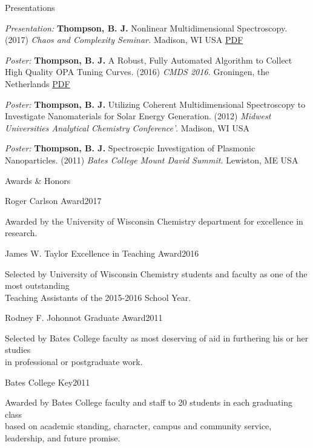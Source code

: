 \documentclass{resume}  %
\begin{document}
\clearpage

\begin{rSection}{Presentations}
  \begin{etaremune}[leftmargin = 1.75 em]
    \item \textit{Presentation:} \textbf{Thompson, B. J.}
      Nonlinear Multidimensional Spectroscopy.
      (2017)
      \textit{Chaos and Complexity Seminar.}
      Madison, WI USA
      \href{https://github.com/untzag/CV/raw/master/supplementary/2017-11-07\%20chaos.pdf}{PDF}
    \item \textit{Poster:}
      \textbf{Thompson, B. J.}
      A Robust, Fully Automated Algorithm to Collect High Quality OPA Tuning Curves.
      (2016)
      \textit{CMDS 2016.}
      Groningen, the Netherlands
      \href{https://github.com/untzag/CV/raw/master/supplementary/2016-06-01\%20CMDS.pdf}{PDF}
    \item \textit{Poster:}
      \textbf{Thompson, B. J.}
      Utilizing Coherent Multidimensional Spectroscopy to Investigate Nanomaterials for Solar
      Energy Generation.
      (2012)
      \textit{Midwest Universities Analytical Chemistry Conference'}.
      Madison, WI USA
    \item \textit{Poster:}
      \textbf{Thompson, B. J.}
      Spectroscpic Investigation of Plasmonic Nanoparticles.
      (2011)
      \textit{Bates College Mount David Summit.}
      Lewiston, ME USA
  \end{etaremune}
\end{rSection}

\begin{rSection}{Awards \& Honors}
  \begin{rSubsection}{Roger Carlson Award}{2017}{}{}
	  \item Awarded by the University of Wisconsin Chemistry department for excellence in research.
  \end{rSubsection}
  \begin{rSubsection}{James W. Taylor Excellence in Teaching Award}{2016}{}{}
    \item  Selected by University of Wisconsin Chemistry students and faculty as one of the most
      outstanding \\ Teaching Assistants of the 2015-2016 School Year.
  \end{rSubsection}
  \begin{rSubsection}{Rodney F. Johonnot Graduate Award}{2011}{}{}
    \item  Selected by Bates College faculty as most deserving of aid in furthering his or her
      studies \\ in professional or postgraduate work.
  \end{rSubsection}
  \begin{rSubsection}{Bates College Key}{2011}{}{}
    \item Awarded by Bates College faculty and staff to 20 students in each graduating class \\
      based on academic standing, character, campus and community service, leadership, and future
      promise.
  \end{rSubsection}
\end{rSection}
\end{document}
